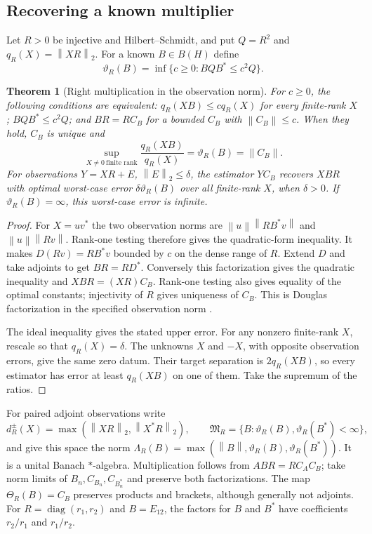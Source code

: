 \documentclass[11pt,a4paper]{amsart}
\numberwithin{equation}{section}
\newtheorem{theorem}{Theorem}[section]
\theoremstyle{definition}
\theoremstyle{remark}
\DeclareMathOperator{\diag}{diag}
\newcommand{\norm}[1]{\left\lVert#1\right\rVert}
\begin{document}
\subsection{Recovering a known multiplier}
Let $R>0$ be injective and Hilbert--Schmidt, and put $Q=R^2$ and $q_R(X)=\norm{XR}_2$. For a known $B\in B(H)$ define
\[
 \vartheta_R(B)=\inf\{c\ge0:BQB^*\le c^2Q\}.
\]
\begin{theorem}[Right multiplication in the observation norm]\label{thm:multiplier}
For $c\ge0$, the following conditions are equivalent:
$q_R(XB)\le cq_R(X)$ for every finite-rank $X$;
$BQB^*\le c^2Q$;
and $BR=RC_B$ for a bounded $C_B$ with $\norm{C_B}\le c$.
When they hold, $C_B$ is unique and
\begin{equation}\label{eq:multiplierconstant}
 \sup_{X\ne0\ \text{finite rank}}\frac{q_R(XB)}{q_R(X)}
 =\vartheta_R(B)=\norm{C_B}.
\end{equation}
For observations $Y=XR+E$, $\norm E_2\le\delta$, the estimator $YC_B$ recovers $XBR$ with optimal worst-case error $\delta\vartheta_R(B)$ over all finite-rank $X$, when $\delta>0$. If $\vartheta_R(B)=\infty$, this worst-case error is infinite.
\end{theorem}
\begin{proof}
For $X=uv^*$ the two observation norms are $\norm u\norm{RB^*v}$ and $\norm u\norm{Rv}$. Rank-one testing therefore gives the quadratic-form inequality. It makes $D(Rv)=RB^*v$ bounded by $c$ on the dense range of $R$. Extend $D$ and take adjoints to get $BR=RD^*$. Conversely this factorization gives the quadratic inequality and
$XBR=(XR)C_B$.
Rank-one testing also gives equality of the optimal constants; injectivity of $R$ gives uniqueness of $C_B$. This is Douglas factorization in the specified observation norm \cite{Douglas}.

The ideal inequality gives the stated upper error. For any nonzero finite-rank $X$, rescale so that $q_R(X)=\delta$. The unknowns $X$ and $-X$, with opposite observation errors, give the same zero datum. Their target separation is $2q_R(XB)$, so every estimator has error at least $q_R(XB)$ on one of them. Take the supremum of the ratios.
\end{proof}

For paired adjoint observations write
\[
 d_R^{\pm}(X)=\max(\norm{XR}_2,\norm{X^*R}_2),\qquad
 \mathfrak M_R=\{B:\vartheta_R(B),\vartheta_R(B^*)<\infty\},
\]
and give this space the norm
$\Lambda_R(B)=\max(\norm B,\vartheta_R(B),\vartheta_R(B^*))$.
It is a unital Banach $*$-algebra. Multiplication follows from $ABR=RC_AC_B$; take norm limits of $B_n,C_{B_n},C_{B_n^*}$ and preserve both factorizations. The map $\Theta_R(B)=C_B$ preserves products and brackets, although generally not adjoints. For $R=\diag(r_1,r_2)$ and $B=E_{12}$, the factors for $B$ and $B^*$ have coefficients $r_2/r_1$ and $r_1/r_2$.
\end{document}
